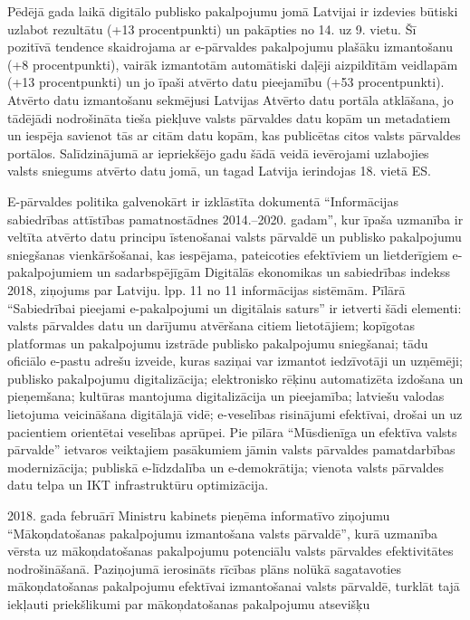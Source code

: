 Pēdējā gada laikā digitālo publisko pakalpojumu jomā Latvijai ir izdevies būtiski uzlabot
rezultātu (+13 procentpunkti) un pakāpties no 14. uz 9. vietu. Šī pozitīvā tendence
skaidrojama ar e-pārvaldes pakalpojumu plašāku izmantošanu (+8 procentpunkti), vairāk
izmantotām automātiski daļēji aizpildītām veidlapām (+13 procentpunkti) un jo īpaši atvērto
datu pieejamību (+53 procentpunkti). Atvērto datu izmantošanu sekmējusi Latvijas Atvērto
datu portāla atklāšana, jo tādējādi nodrošināta tieša piekļuve valsts pārvaldes datu kopām
un metadatiem un iespēja savienot tās ar citām datu kopām, kas publicētas citos valsts
pārvaldes portālos. Salīdzinājumā ar iepriekšējo gadu šādā veidā ievērojami uzlabojies
valsts sniegums atvērto datu jomā, un tagad Latvija ierindojas 18. vietā ES.
\par
E-pārvaldes politika galvenokārt ir izklāstīta dokumentā “Informācijas sabiedrības attīstības
pamatnostādnes 2014.–2020. gadam”, kur īpaša uzmanība ir veltīta atvērto datu principu
īstenošanai valsts pārvaldē un publisko pakalpojumu sniegšanas vienkāršošanai, kas
iespējama, pateicoties efektīviem un lietderīgiem e-pakalpojumiem un sadarbspējīgām
Digitālās ekonomikas un sabiedrības indekss 2018, ziņojums par Latviju. lpp. 11 no 11
informācijas sistēmām. Pīlārā “Sabiedrībai pieejami e-pakalpojumi un digitālais saturs” ir
ietverti šādi elementi: valsts pārvaldes datu un darījumu atvēršana citiem lietotājiem;
kopīgotas platformas un pakalpojumu izstrāde publisko pakalpojumu sniegšanai; tādu
oficiālo e-pastu adrešu izveide, kuras saziņai var izmantot iedzīvotāji un uzņēmēji; publisko
pakalpojumu digitalizācija; elektronisko rēķinu automatizēta izdošana un pieņemšana;
kultūras mantojuma digitalizācija un pieejamība; latviešu valodas lietojuma veicināšana
digitālajā vidē; e-veselības risinājumi efektīvai, drošai un uz pacientiem orientētai veselības
aprūpei. Pie pīlāra “Mūsdienīga un efektīva valsts pārvalde” ietvaros veiktajiem pasākumiem
jāmin valsts pārvaldes pamatdarbības modernizācija; publiskā e-līdzdalība un e-demokrātija;
vienota valsts pārvaldes datu telpa un IKT infrastruktūru optimizācija.
\par
2018. gada februārī Ministru kabinets pieņēma informatīvo ziņojumu “Mākoņdatošanas
pakalpojumu izmantošana valsts pārvaldē”, kurā uzmanība vērsta uz mākoņdatošanas
pakalpojumu potenciālu valsts pārvaldes efektivitātes nodrošināšanā. Paziņojumā ierosināts
rīcības plāns nolūkā sagatavoties mākoņdatošanas pakalpojumu efektīvai izmantošanai
valsts pārvaldē, turklāt tajā iekļauti priekšlikumi par mākoņdatošanas pakalpojumu atsevišķu
